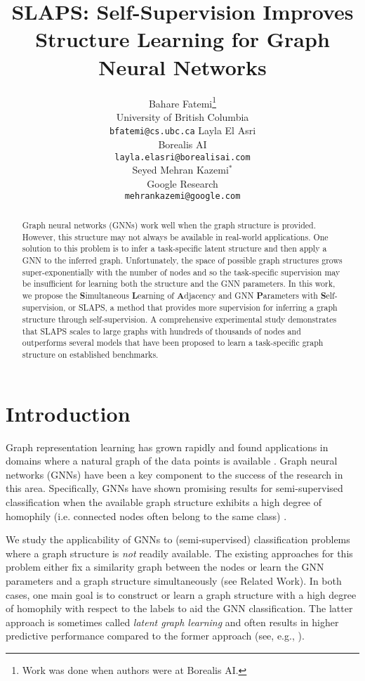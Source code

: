 \documentclass{article}
\title{SLAPS: Self-Supervision Improves Structure Learning for Graph Neural Networks}
\author{Bahare Fatemi\thanks{Work was done when authors were at Borealis AI.} \\
  University of British Columbia\\
  \texttt{bfatemi@cs.ubc.ca}
\AND
   Layla El Asri \\
   Borealis AI \\
\texttt{layla.elasri@borealisai.com} \\
   \And
   Seyed Mehran Kazemi$^*$\\
   Google Research \\
\texttt{mehrankazemi@google.com} \\
}
\begin{document}
\maketitle

\begin{abstract}
Graph neural networks (GNNs) work well when the graph structure is provided. However, this structure may not always be available in real-world applications.
One solution to this problem is to infer a task-specific latent structure and then apply a GNN to the inferred graph. Unfortunately, the space of possible graph structures grows super-exponentially with the number of nodes and so the task-specific supervision may be insufficient for learning both the structure and the GNN parameters.
In this work, we propose the \textbf{S}imultaneous \textbf{L}earning of \textbf{A}djacency and GNN \textbf{P}arameters with \textbf{S}elf-supervision, or SLAPS, a method that provides more supervision for inferring a graph structure through self-supervision. 
A comprehensive experimental study demonstrates that SLAPS scales to large graphs with hundreds of thousands of nodes and outperforms several models that have been proposed to learn a task-specific graph structure on established benchmarks.
\end{abstract}
\section{Introduction} \label{sec:intro}
Graph representation learning has grown rapidly and found applications in domains where a natural graph of the data points is available \citep{chami2020machine,kazemi2020relational}. Graph neural networks (GNNs) \citep{scarselli2008graph} have been a key component to the success of the research in this area. Specifically, GNNs have shown promising results for semi-supervised classification when the available graph structure exhibits a high degree of homophily (i.e. connected nodes often belong to the same class) \cite{zhu2020beyond}. 

We study the applicability of GNNs to (semi-supervised) classification problems where a graph structure is \emph{not} readily available. The existing approaches for this problem either fix a similarity graph between the nodes or learn the GNN parameters and a graph structure simultaneously (see Related Work). In both cases, one main goal is to construct or learn a graph structure with a high degree of homophily with respect to the labels to aid the GNN classification. The latter approach is sometimes called \emph{latent graph learning} and often results in higher predictive performance compared to the former approach (see, e.g., \cite{franceschi2019learning}).
\end{document}
